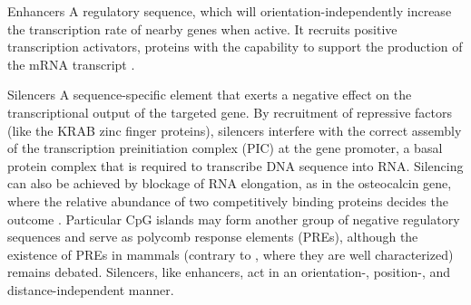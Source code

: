 \begin{mydescription}{0.5cm}
	\item[Enhancers] A regulatory sequence, which will orientation-independently increase the transcription rate of nearby genes when active\cite{Marsman2012,Gibcus2013}. It recruits positive transcription activators, proteins with the capability to support the production of the mRNA transcript .
	
	\item[Silencers] A sequence-specific element that exerts a negative effect on the transcriptional output of the targeted gene. By recruitment of repressive factors (like the KRAB zinc finger proteins\cite{Witzgall1994,Urrutia2003}), silencers interfere with the correct assembly of the transcription preinitiation complex (PIC) at the gene promoter\cite{Ogbourne1998}, a basal protein complex that is required to transcribe DNA sequence into RNA. Silencing can also be achieved by blockage of RNA elongation, as in the osteocalcin gene, where the relative abundance of two competitively binding proteins decides the outcome \cite{Frenkel1994,Li1995}. Particular CpG islands may form another group of negative regulatory sequences and serve as polycomb response elements (PREs), although the existence of PREs in mammals (contrary to , where they are well characterized) remains debated\cite{Kassis2013,Bauer2016,Rickels2017}. Silencers, like enhancers, act in an orientation-, position-, and distance-independent manner.
	

\end{mydescription}
